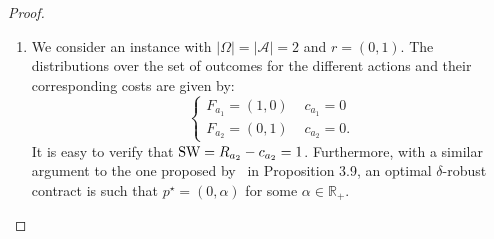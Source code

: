 \begin{proof}
\begin{enumerate}
		We also observe that the principal's utility in $\alpha_{\kappa}$ is such that:
		\begin{align*}
			u(\alpha_{\kappa}) = (1-\delta)(1- \gamma_{\kappa} \sqrt{\delta} ).
		\end{align*}
		since $\gamma_k>1$ and $\delta>0$.
		Thanks to the definition of $\kappa$, with a simple calculation, it possible to show that:
		$$\kappa = \begin{cases}
			\vspace{1mm}
			\left\lceil\frac{1}{1-\sqrt{\delta}}\right\rceil \,\,\ & \textnormal{if} \,\,\, \frac{1}{1-\sqrt{\delta}} \not \in \mathbb{N}\\
			\frac{1}{1-\sqrt{\delta}} +1 \,\,\ & \textnormal{if} \,\,\, \frac{1}{1-\sqrt{\delta}} \in \mathbb{N}.\\
		\end{cases}$$
		Thus, when ${1}/{(1-\sqrt{\delta})}\not \in \mathbb{N}$, we have:
		\begin{align*}
			u(\alpha_{\kappa}) &= (1-\delta)(1- \gamma_{\kappa} \sqrt{\delta} )\\
			&= (1-\delta)\left(1- 
			\frac{\left\lceil\frac{1}{1-\sqrt{\delta}}\right\rceil }{ \left\lceil\frac{1}{1-\sqrt{\delta}}\right\rceil -1} \sqrt{\delta}\right)\\
			&\le (1-\delta)\left(1-2\sqrt{\delta}+\delta\right).
		\end{align*}
		Similarly, it is possible to show that the same relation holds even when ${1}/{(1-\sqrt{\delta})} \in \mathbb{N}$.
		Finally, by putting all together, we have that:
		\begin{align*}
			\textnormal{OPT}(\delta) -\textnormal{OPT}_{\textnormal{LB}}(\delta) 
			& \le \max_{i \in [2n+1]} u(\alpha_i) - (1 - 2 \sqrt{\delta} + \delta )\\
			&= u(\alpha_{n+1}) - (1 - 2 \sqrt{\delta} + \delta ) \le \frac{\sqrt{\delta}}{n},
		\end{align*}
		concluding the first part of the proof.
		\item We consider an instance with $|\Omega|=|\mathcal{A}|=2$ and $r=(0,1)$.
		The distributions over the set of outcomes for the different actions and their corresponding costs are given by:
		$$ \begin{cases}
			F_{a_1}=(1,0) \,\, &c_{a_1}=0\\
			F_{a_2}=(0,1) \,\, &c_{a_2}=0.
		\end{cases}$$
		It is easy to verify that $\textnormal{SW}=R_{a_2}-c_{a_2}=1$. 
		Furthermore, with a similar argument to the one proposed by~\cite{dutting2024algorithmic} in Proposition 3.9, an optimal $\delta$-robust contract is such that $p^\star = (0, \alpha)$ for some $\alpha \in \mathbb{R}_{+}$.
		

\end{enumerate}
\end{proof}
